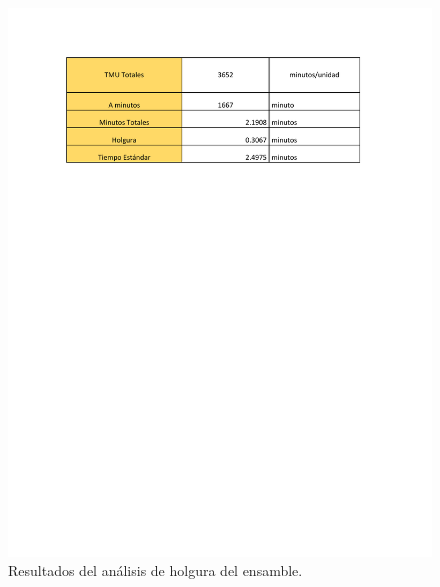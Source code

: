                 \begin{figure}[H]
        \centering
        \includegraphics[trim = {25mm 190mm 1mm 20mm},clip,scale=0.4]{19/Img/resultadoTMU.pdf}
        \newpage
        \caption{Resultados del análisis de holgura del ensamble.}
        \label{fig:resultadoTMU}    
    \end{figure}

